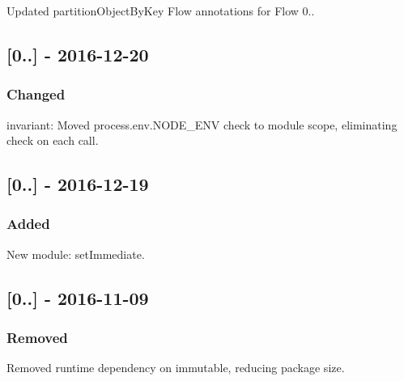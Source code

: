 \begin{DoxyItemize}
\item Updated {\ttfamily partition\+Object\+By\+Key} Flow annotations for Flow 0..
\end{DoxyItemize}

\subsection*{\mbox{[}0..\mbox{]} -\/ 2016-\/12-\/20}

\subsubsection*{Changed}


\begin{DoxyItemize}
\item {\ttfamily invariant}\+: Moved {\ttfamily process.\+env.\+N\+O\+D\+E\+\_\+\+E\+NV} check to module scope, eliminating check on each call.
\end{DoxyItemize}

\subsection*{\mbox{[}0..\mbox{]} -\/ 2016-\/12-\/19}

\subsubsection*{Added}


\begin{DoxyItemize}
\item New module\+: {\ttfamily set\+Immediate}.
\end{DoxyItemize}

\subsection*{\mbox{[}0..\mbox{]} -\/ 2016-\/11-\/09}

\subsubsection*{Removed}


\begin{DoxyItemize}
\item Removed runtime dependency on immutable, reducing package size.
\end{DoxyItemize}

